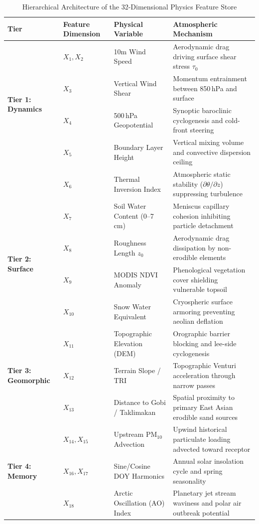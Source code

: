 \begin{table}[H]
\centering
\small
\caption{Hierarchical Architecture of the 32-Dimensional Physics Feature Store}
\label{tab:feature_engineering_tiers}
\begin{tabularx}{\textwidth}{l l p{3.2cm} X}
\toprule
\textbf{Tier} & \textbf{Feature Dimension} & \textbf{Physical Variable} & \textbf{Atmospheric Mechanism} \\
\midrule
\multirow{4}{*}{\textbf{Tier 1: Dynamics}} 
& $X_1, X_2$ & 10m Wind Speed & Aerodynamic drag driving surface shear stress $\tau_0$ \\
& $X_3$ & Vertical Wind Shear & Momentum entrainment between 850\,hPa and surface \\
& $X_4$ & 500\,hPa Geopotential & Synoptic baroclinic cyclogenesis and cold-front steering \\
& $X_5$ & Boundary Layer Height & Vertical mixing volume and convective dispersion ceiling \\
& $X_6$ & Thermal Inversion Index & Atmospheric static stability ($\partial \theta / \partial z$) suppressing turbulence \\
\midrule
\multirow{4}{*}{\textbf{Tier 2: Surface}} 
& $X_7$ & Soil Water Content (0--7\,cm) & Meniscus capillary cohesion inhibiting particle detachment \\
& $X_8$ & Roughness Length $z_0$ & Aerodynamic drag dissipation by non-erodible elements \\
& $X_9$ & MODIS NDVI Anomaly & Phenological vegetation cover shielding vulnerable topsoil \\
& $X_{10}$ & Snow Water Equivalent & Cryospheric surface armoring preventing aeolian deflation \\
\midrule
\multirow{3}{*}{\textbf{Tier 3: Geomorphic}} 
& $X_{11}$ & Topographic Elevation (DEM) & Orographic barrier blocking and lee-side cyclogenesis \\
& $X_{12}$ & Terrain Slope / TRI & Topographic Venturi acceleration through narrow passes \\
& $X_{13}$ & Distance to Gobi / Taklimakan & Spatial proximity to primary East Asian erodible sand sources \\
\midrule
\multirow{3}{*}{\textbf{Tier 4: Memory}} 
& $X_{14}, X_{15}$ & Upstream $\text{PM}_{10}$ Advection & Upwind historical particulate loading advected toward receptor \\
& $X_{16}, X_{17}$ & Sine/Cosine DOY Harmonics & Annual solar insolation cycle and spring seasonality \\
& $X_{18}$ & Arctic Oscillation (AO) Index & Planetary jet stream waviness and polar air outbreak potential \\
\bottomrule
\end{tabularx}
\end{table}

